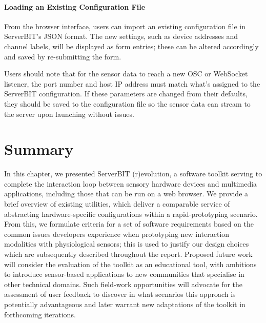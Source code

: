 \paragraph{Loading an Existing Configuration File}

From the browser interface, users can import an existing configuration file in ServerBIT's JSON format. The new settings, such as device addresses and channel labels, will be displayed as form entries; these can be altered accordingly and saved by re-submitting the form.

Users should note that for the sensor data to reach a new OSC or WebSocket listener, the port number and host IP address must match what's assigned to the ServerBIT configuration. If these parameters are changed from their defaults, they should be saved to the configuration file so the sensor data can stream to the server upon launching without issues.

\section{Summary}

In this chapter, we presented ServerBIT (r)evolution, a software toolkit serving to complete the interaction loop between sensory hardware devices and multimedia applications, including those that can be run on a web browser. We provide a brief overview of existing utilities, which deliver a comparable service of abstracting hardware-specific configurations within a rapid-prototyping scenario. From this, we formulate criteria for a set of software requirements based on the common issues developers experience when prototyping new interaction modalities with physiological sensors; this is used to justify our design choices which are subsequently described throughout the report.
Proposed future work will consider the evaluation of the toolkit as an educational tool, with ambitions to introduce sensor-based applications to new communities that specialise in other technical domains. Such field-work opportunities will advocate for the assessment of user feedback to discover in what scenarios this approach is potentially advantageous and later warrant new adaptations of the toolkit in forthcoming iterations.
